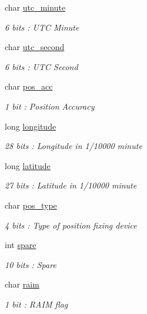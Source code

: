 \begin{DoxyCompactItemize}
char \mbox{\hyperlink{structaismsg__11_a6eb48cd12b8e839a768109d820489fa1}{utc\+\_\+minute}}
\begin{DoxyCompactList}\small\item\em 6 bits \+: U\+TC Minute \end{DoxyCompactList}\item 
char \mbox{\hyperlink{structaismsg__11_a5aad3a20977f8a95a9c79f459a6e89f0}{utc\+\_\+second}}
\begin{DoxyCompactList}\small\item\em 6 bits \+: U\+TC Second \end{DoxyCompactList}\item 
char \mbox{\hyperlink{structaismsg__11_a490e48106a94e377432062bf955f430c}{pos\+\_\+acc}}
\begin{DoxyCompactList}\small\item\em 1 bit \+: Position Accuracy \end{DoxyCompactList}\item 
long \mbox{\hyperlink{structaismsg__11_a5a503c16d031b3e8ddbfb169ba07e271}{longitude}}
\begin{DoxyCompactList}\small\item\em 28 bits \+: Longitude in 1/10000 minute \end{DoxyCompactList}\item 
long \mbox{\hyperlink{structaismsg__11_a95446c6a1f69364c5506598ae66d7339}{latitude}}
\begin{DoxyCompactList}\small\item\em 27 bits \+: Latitude in 1/10000 minute \end{DoxyCompactList}\item 
char \mbox{\hyperlink{structaismsg__11_ad95c35ee4364bc769b8ddbf03aa557d5}{pos\+\_\+type}}
\begin{DoxyCompactList}\small\item\em 4 bits \+: Type of position fixing device \end{DoxyCompactList}\item 
int \mbox{\hyperlink{structaismsg__11_afb7ce3a87db5a4cb8eced18e512ba1a4}{spare}}
\begin{DoxyCompactList}\small\item\em 10 bits \+: Spare \end{DoxyCompactList}\item 
char \mbox{\hyperlink{structaismsg__11_a2541000f514e98bbd61fb9f9f50fa349}{raim}}
\begin{DoxyCompactList}\small\item\em 1 bit \+: R\+A\+IM flag \end{DoxyCompactList}\item 

\end{DoxyCompactItemize}
